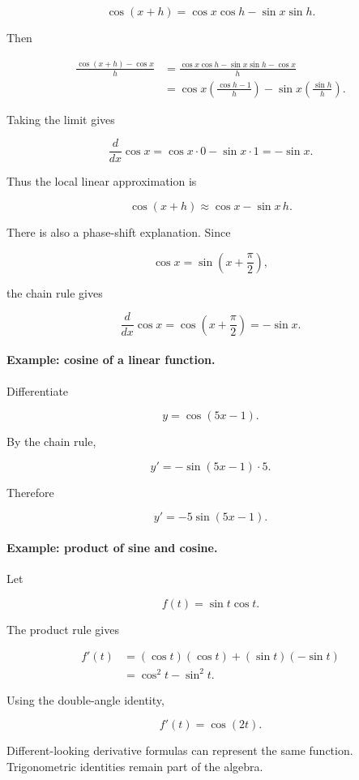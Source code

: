 \[
\cos(x+h)=\cos x\cos h-\sin x\sin h.
\]

Then

\begin{align*}
\frac{\cos(x+h)-\cos x}{h}
&=
\frac{\cos x\cos h-\sin x\sin h-\cos x}{h}
\\
&=
\cos x\left(\frac{\cos h-1}{h}\right)
-
\sin x\left(\frac{\sin h}{h}\right).
\end{align*}

Taking the limit gives

\[
\frac{d}{dx}\cos x
=
\cos x\cdot0-\sin x\cdot1
=
-\sin x.
\]

Thus the local linear approximation is

\[
\boxed{
\cos(x+h)
\approx
\cos x-\sin x\,h.
}
\]

There is also a phase-shift explanation. Since

\[
\cos x=\sin\left(x+\frac{\pi}{2}\right),
\]

the chain rule gives

\[
\frac{d}{dx}\cos x
=
\cos\left(x+\frac{\pi}{2}\right)
=
-\sin x.
\]

\paragraph{Example: cosine of a linear function.}
Differentiate

\[
y=\cos(5x-1).
\]

By the chain rule,

\[
y'
=
-\sin(5x-1)\cdot5.
\]

Therefore

\[
\boxed{
y'=-5\sin(5x-1).
}
\]

\paragraph{Example: product of sine and cosine.}
Let

\[
f(t)=\sin t\cos t.
\]

The product rule gives

\begin{align*}
f'(t)
&=
(\cos t)(\cos t)+(\sin t)(-\sin t)
\\
&=
\cos^2t-\sin^2t.
\end{align*}

Using the double-angle identity,

\[
\boxed{
f'(t)=\cos(2t).
}
\]

Different-looking derivative formulas can represent the same function. Trigonometric
identities remain part of the algebra.

